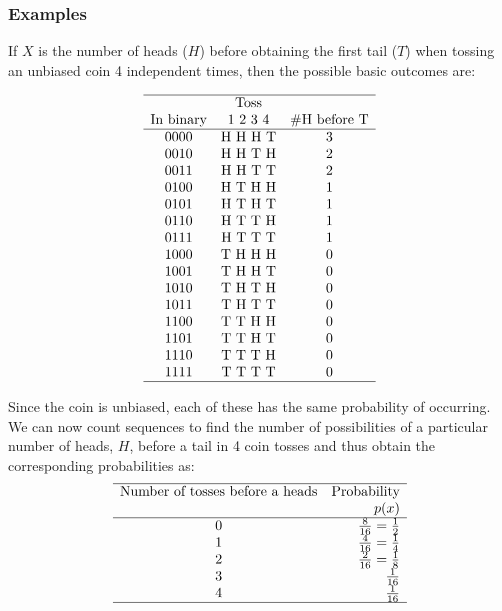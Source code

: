\documentclass[12pt,a4paper]{article}
\theoremstyle{regla}
\theoremstyle{remark}
\theoremstyle{definition}
\theoremstyle{nonumberbreak}
\begin{document}
\subsubsection{Examples}
\begin{xmpl}
If $X$ is the number of heads ($H$) before obtaining the first tail ($T$) when tossing an unbiased coin 4 independent times, then the possible basic outcomes are:

$$
\begin{array}{c c c}
\hline
         & \text{Toss}    &   \\
\text{In binary} & 1\ 2\ 3\ 4 & \#\text{H before T}\\
\hline				
  0000 & \text{H H H T} & 3\\
  0010 & \text{H H T H} & 2\\
  0011 & \text{H H T T} & 2\\
  0100 & \text{H T H H} & 1\\
  0101 & \text{H T H T} & 1\\
  0110 & \text{H T T H} & 1\\
  0111 & \text{H T T T} & 1\\
  1000 & \text{T H H H} & 0\\
  1001 & \text{T H H T} & 0\\
  1010 & \text{T H T H} & 0\\
  1011 & \text{T H T T} & 0\\
  1100 & \text{T T H H} & 0\\
  1101 & \text{T T H T} & 0\\
  1110 & \text{T T T H} & 0\\
  1111 & \text{T T T T} & 0\\
\hline
\end{array}
$$

Since the coin is unbiased, each of these has the 
same probability of occurring.  We can now count sequences to find the number of possibilities of a particular number of heads, $H$, before a tail in 4 coin tosses and thus obtain the corresponding probabilities as:\\

$$
\begin{array}{c r}
\hline
\text{Number of tosses before a heads} & \text{Probability}\\
 & p(x)\\
\hline
0 & \frac{8}{16}=\frac{1}{2}\\
1 & \frac{4}{16}=\frac{1}{4}\\
2 & \frac{2}{16}=\frac{1}{8}\\
3 & \frac{1}{16}\\
4 & \frac{1}{16}\\
\hline
\end{array}
$$

\end{xmpl}
\end{document}
